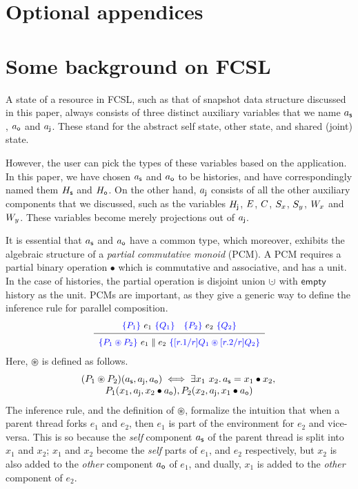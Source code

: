 \section*{Optional appendices}

\section{Some background on FCSL}
\label{sc:background}

A state of a resource in FCSL, such as that of snapshot data structure
discussed in this paper, always consists of three distinct auxiliary
variables that we name $a_{\mathsf{s}}$, $a_{\mathsf{o}}$ and $a_{\mathsf{j}}$. These stand
for the abstract self state, other state, and shared (joint) state.

However, the user can pick the types of these variables based on the
application. In this paper, we have chosen $a_{\mathsf{s}}$ and $a_{\mathsf{o}}$ to be
histories, and have correspondingly named them $H_{\mathsf{s}}$ and $H_{\mathsf{o}}$.
On the other hand, $a_{\mathsf{j}}$ consists of all the other auxiliary
components that we discussed, such as the variables $H_{\mathsf{j}}$, $E$,
$C$, $S_x$, $S_y$, $W_x$ and $W_y$. These variables become merely
projections out of $a_{\mathsf{j}}$.

It is essential that $a_{\mathsf{s}}$ and $a_{\mathsf{o}}$ have a common type, which
moreover, exhibits the algebraic structure of a \emph{partial
  commutative monoid} (PCM). A PCM requires a partial binary operation
$\bullet$ which is commutative and associative, and has a unit. In the
case of histories, the partial operation is disjoint union $\hunion$
with $\mathsf{empty}$ history as the unit. PCMs are important, as they
give a generic way to define the inference rule for parallel
composition.
%
\[
{\small{
\begin{array}{c}
\ensuremath{\textcolor{blue}{\{P_1\}}}\ e_1\ \ensuremath{\textcolor{blue}{\{Q_1\}}} \quad \ensuremath{\textcolor{blue}{\{P_2\}}}\ e_2\ \ensuremath{\textcolor{blue}{\{Q_2\}}} \\[2pt]
\hline\\[-7pt]
\ensuremath{\textcolor{blue}{\{P_1 \circledast P_2\}}}\ e_1 \parallel e_2\ \ensuremath{\textcolor{blue}{\{[r.1/r]Q_1 \circledast [r.2/r]Q_2\}}} 
\end{array}
}}
\]
%
Here, $\circledast$ is defined as follows.
\[
\begin{array}{c}
(P_1 \circledast P_2)(a_{\mathsf{s}}, a_{\mathsf{j}}, a_{\mathsf{o}}) \iff \exists x_1~x_2\mathord{.}\, a_{\mathsf{s}} = x_1 \bullet x_2, \hbox{}\\
 P_1 (x_1, a_{\mathsf{j}}, x_2 \bullet a_{\mathsf{o}}), P_2 (x_2, a_{\mathsf{j}}, x_1 \bullet a_{\mathsf{o}})
\end{array}
\]
%
%
The inference rule, and the definition of $\circledast$, formalize the
intuition that when a parent thread forks $e_1$ and $e_2$, then $e_1$
is part of the environment for $e_2$ and vice-versa. This is so
because the \emph{self} component $a_{\mathsf{s}}$ of the parent thread is
split into $x_1$ and $x_2$; $x_1$ and $x_2$ become the \emph{self}
parts of $e_1$, and $e_2$ respectively, but $x_2$ is also added to the
\emph{other} component $a_{\mathsf{o}}$ of $e_1$, and dually, $x_1$ is added
to the \emph{other} component of $e_2$.

